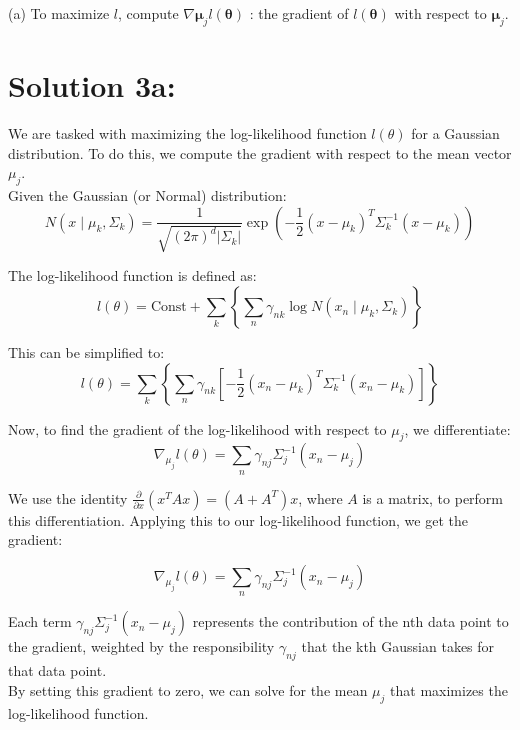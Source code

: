 \documentclass[10pt]{article}
\begin{document}
(a) To maximize $l$, compute $\nabla \boldsymbol{\mu}_{j} l(\boldsymbol{\theta})$ : the gradient of $l(\boldsymbol{\theta})$ with respect to $\boldsymbol{\mu}_{j}$.

\section*{Solution 3a:}

We are tasked with maximizing the log-likelihood function \( l(\theta) \) for a Gaussian distribution. To do this, we compute the gradient with respect to the mean vector \( \mu_j \). \\

Given the Gaussian (or Normal) distribution: \\

\[
N(x \mid \mu_k, \Sigma_k) = \frac{1}{\sqrt{(2\pi)^d |\Sigma_k|}} \exp\left( -\frac{1}{2} (x - \mu_k)^T\Sigma_k^{-1}(x - \mu_k) \right)
\]

The log-likelihood function is defined as: \\

\[
l(\theta) = \text{Const} + \sum_{k} \left\{ \sum_{n} \gamma_{nk} \log N(x_n \mid \mu_k, \Sigma_k) \right\}
\]

This can be simplified to: \\

\[
l(\theta) = \sum_k \left\{ \sum_n \gamma_{nk} \left[ -\frac{1}{2} (x_n - \mu_k)^T\Sigma_k^{-1}(x_n - \mu_k) \right] \right\}
\]

Now, to find the gradient of the log-likelihood with respect to \( \mu_j \), we differentiate: \\

\[
\nabla_{\mu_j} l(\theta) = \sum_n \gamma_{nj} \Sigma_j^{-1} (x_n - \mu_j)
\]

We use the identity \( \frac{\partial}{\partial x} (x^T A x) = (A + A^T) x \), where \( A \) is a matrix, to perform this differentiation. Applying this to our log-likelihood function, we get the gradient:

\[
\nabla_{\mu_j} l(\theta) = \sum_n \gamma_{nj} \Sigma_j^{-1} (x_n - \mu_j)
\]

Each term \( \gamma_{nj} \Sigma_j^{-1} (x_n - \mu_j) \) represents the contribution of the nth data point to the gradient, weighted by the responsibility \( \gamma_{nj} \) that the kth Gaussian takes for that data point. \\

By setting this gradient to zero, we can solve for the mean \( \mu_j \) that maximizes the log-likelihood function. \\
\end{document}
